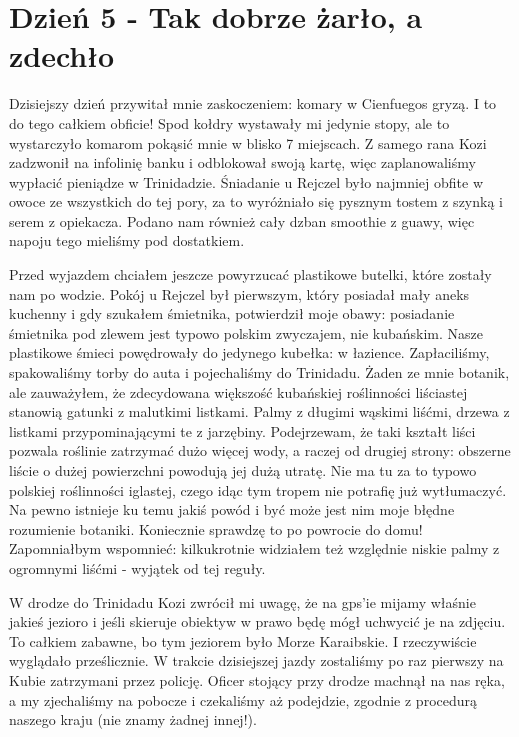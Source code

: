 
\chapter[Tak dobrze żarło, a zdechło]{Dzień 5 - Tak dobrze żarło, a zdechło}

Dzisiejszy dzień przywitał mnie zaskoczeniem: komary w Cienfuegos gryzą.
I to do tego całkiem obficie!
Spod kołdry wystawały mi jedynie stopy, ale to wystarczyło komarom pokąsić mnie w blisko 7 miejscach.
Z samego rana Kozi zadzwonił na infolinię banku i odblokował swoją kartę, więc zaplanowaliśmy wypłacić pieniądze w Trinidadzie.
Śniadanie u Rejczel było najmniej obfite w owoce ze wszystkich do tej pory, za to wyróżniało się pysznym tostem z szynką i serem z opiekacza.
Podano nam również cały dzban smoothie z guawy, więc napoju tego mieliśmy pod dostatkiem.
\par Przed wyjazdem chciałem jeszcze powyrzucać plastikowe butelki, które zostały nam po wodzie.
Pokój u Rejczel był pierwszym, który posiadał mały aneks kuchenny i gdy szukałem śmietnika, potwierdził moje obawy: posiadanie śmietnika pod zlewem jest typowo polskim zwyczajem, nie kubańskim.
Nasze plastikowe śmieci powędrowały do jedynego kubełka: w łazience.
Zapłaciliśmy, spakowaliśmy torby do auta i pojechaliśmy do Trinidadu.
Żaden ze mnie botanik, ale zauważyłem, że zdecydowana większość kubańskiej roślinności liściastej stanowią gatunki z malutkimi listkami.
Palmy z długimi wąskimi liśćmi, drzewa z listkami przypominającymi te z jarzębiny.
Podejrzewam, że taki kształt liści pozwala roślinie zatrzymać dużo więcej wody, a raczej od drugiej strony: obszerne liście o dużej powierzchni powodują jej dużą utratę.
Nie ma tu za to typowo polskiej roślinności iglastej, czego idąc tym tropem nie potrafię już wytłumaczyć.
Na pewno istnieje ku temu jakiś powód i być może jest nim moje błędne rozumienie botaniki.
Koniecznie sprawdzę to po powrocie do domu!
Zapomniałbym wspomnieć: kilkukrotnie widziałem też względnie niskie palmy z ogromnymi liśćmi - wyjątek od tej reguły.
\par W drodze do Trinidadu Kozi zwrócił mi uwagę, że na gps’ie mijamy właśnie jakieś jezioro i jeśli skieruje obiektyw w prawo będę mógł uchwycić je na zdjęciu.
To całkiem zabawne, bo tym jeziorem było Morze Karaibskie.
I rzeczywiście wyglądało prześlicznie.
W trakcie dzisiejszej jazdy zostaliśmy po raz pierwszy na Kubie zatrzymani przez policję.
Oficer stojący przy drodze machnął na nas ręka, a my zjechaliśmy na pobocze i czekaliśmy aż podejdzie, zgodnie z procedurą naszego kraju (nie znamy żadnej innej!).

